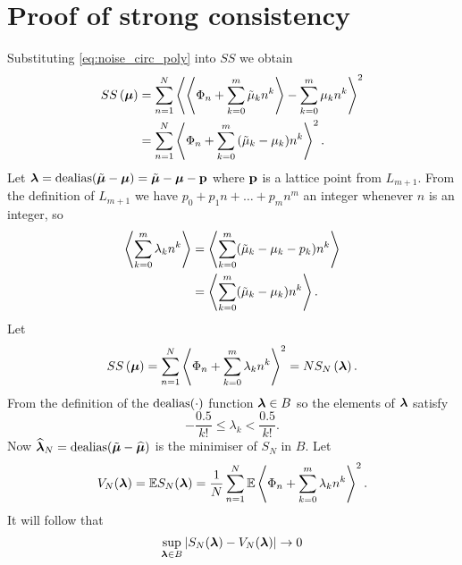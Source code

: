 \documentclass[journal]{IEEEtran}
\begin{document}

\section{Proof of strong consistency}\label{sec:strongconstproof}
 Substituting \eqref{eq:noise_circ_poly} into $SS$ we obtain
 \begin{align*}
SS\left( \boldsymbol{\mu} \right) &= \sum_{n=1}^{N}\left\langle  \left\langle  \Phi_n + \sum_{k = 0}^{m}{\tilde{\mu}_k n^k}  \right\rangle - \sum_{k = 0}^{m}{\mu_k n^k}  \right\rangle^{2} \\
&= \sum_{n=1}^{N}\left\langle   \Phi_n + \sum_{k = 0}^{m}{(\tilde{\mu}_k - \mu_k) n^k}  \right\rangle^{2}.
\end{align*}
Let $\boldsymbol{\lambda} = \operatorname{dealias}(\tilde{\boldsymbol{\mu}} - \boldsymbol{\mu}) = \tilde{\boldsymbol{\mu}} - \boldsymbol{\mu} - \mathbf{p}$ where $\mathbf{p}$ is a lattice point from $L_{m+1}$. From the definition of $L_{m+1}$ we have $p_0 + p_1 n + \dots + p_{m} n^m$ an integer whenever $n$ is an integer, so
\begin{align*}
\left\langle \sum_{k=0}^{m}\lambda_k n^k  \right\rangle &= \left\langle \sum_{k=0}^{m}(\tilde{\mu}_k - \mu_k - p_k) n^k  \right\rangle \\
&= \left\langle \sum_{k=0}^{m}(\tilde{\mu}_k - \mu_k) n^k  \right\rangle.
\end{align*}
Let
\[
SS\left( \boldsymbol{\mu} \right) = \sum_{n=1}^{N}\left\langle   \Phi_n + \sum_{k = 0}^{m}{\lambda_k n^k}  \right\rangle  ^{2} = N S_{N}\left( \boldsymbol{\lambda} \right).
 \]
From the definition of the $\operatorname{dealias}(\cdot)$ function $\boldsymbol{\lambda} \in B$ so the elements of $\boldsymbol{\lambda}$ satisfy
 \begin{equation} \label{eq:identifiability}
 -\frac{0.5}{k!} \leq \lambda_k < \frac{0.5}{k!}.
 \end{equation} 
Now $\widehat{\boldsymbol{\lambda}}_N = \operatorname{dealias}(\tilde{\boldsymbol{\mu}} - \widehat{\boldsymbol{\mu}})$ is the minimiser of $S_{N}$ in $B$.  %
Let
\[
V_N(\boldsymbol{\lambda}) =  {\mathbb E} S_N(\boldsymbol{\lambda}) = \frac{1}{N}\sum_{n=1}^{N} {\mathbb E} \left\langle   \Phi_{n}+\sum_{k = 0}^{m}{\lambda_k n^k} \right\rangle  ^{2}.
\]
It will follow that
 \begin{equation}\label{eq:SNVNunifmlln}
\sup_{\lambdabf \in B}\sabs{S_N(\lambdabf) - V_N(\lambdabf)} \rightarrow 0  
 \end{equation}
\end{document}
